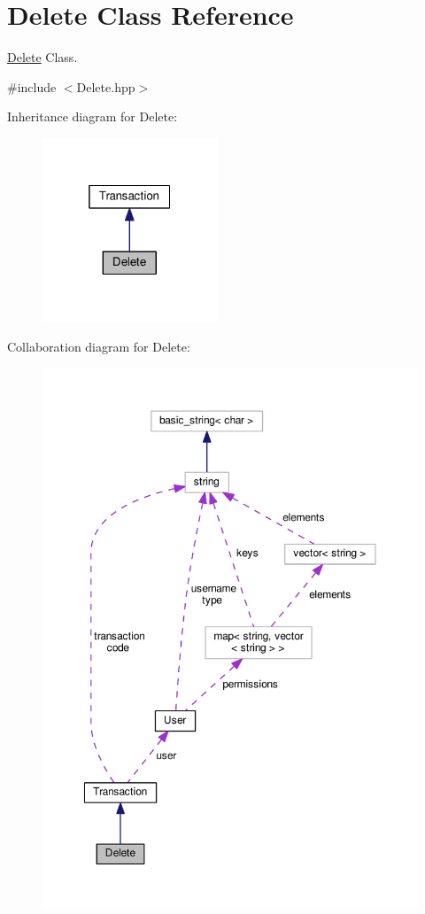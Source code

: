 \hypertarget{class_delete}{\section{Delete Class Reference}
\label{class_delete}
}


\hyperlink{class_delete}{Delete} Class.  




{\ttfamily \#include $<$Delete.\-hpp$>$}



Inheritance diagram for Delete\-:
\nopagebreak
\begin{figure}[H]
\begin{center}
\leavevmode
\includegraphics[width=148pt]{class_delete__inherit__graph}
\end{center}
\end{figure}


Collaboration diagram for Delete\-:
\nopagebreak
\begin{figure}[H]
\begin{center}
\leavevmode
\includegraphics[width=350pt]{class_delete__coll__graph}
\end{center}
\end{figure}
